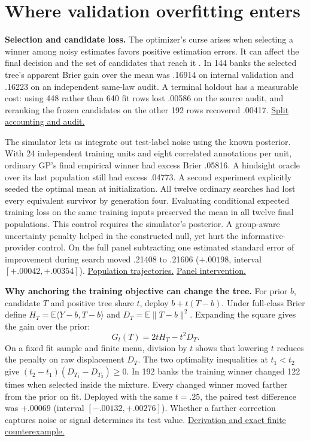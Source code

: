 \documentclass[10pt,a4paper]{article}
\newcommand{\FB}[2]{\href{https://github.com/damiankucharski/fusionbench/blob/5f9254e0c6e4559d7c0d19f28dc91641fba09d57/docs/ensemble-study/#1}{#2}}
\begin{document}


\section{Where validation overfitting enters}
\textbf{Selection and candidate loss.}
The optimizer's curse arises when selecting a winner among noisy estimates favors positive estimation errors. It can affect the final decision and the set of candidates that reach it \cite{cawley}. In 144 banks the selected tree's apparent Brier gain over the mean was .16914 on internal validation and .16223 on an independent same-law audit. A terminal holdout has a measurable cost: using 448 rather than 640 fit rows lost .00586 on the source audit, and reranking the frozen candidates on the other 192 rows recovered .00417. \FB{validation-curse/README.md}{Split accounting and audit.}

The simulator lets us integrate out test-label noise using the known posterior. With 24 independent training units and eight correlated annotations per unit, ordinary GP's final empirical winner had excess Brier .05816. A hindsight oracle over its last population still had excess .04773. A second experiment explicitly seeded the optimal mean at initialization. All twelve ordinary searches had lost every equivalent survivor by generation four. Evaluating conditional expected training loss on the same training inputs preserved the mean in all twelve final populations. This control requires the simulator's posterior. A group-aware uncertainty penalty helped in the constructed null, yet hurt the informative-provider control. On the full panel subtracting one estimated standard error of improvement during search moved .21408 to .21606 ($+.00198$, interval $[+.00042,+.00354]$). \FB{validation-curse/grouped/README.md}{Population trajectories.} \FB{validation-curse/panel/round2/README.md}{Panel intervention.}

\textbf{Why anchoring the training objective can change the tree.}
For prior $b$, candidate $T$ and positive tree share $t$, deploy $b+t(T-b)$. Under full-class Brier define $H_T=\mathbb E\langle Y-b,T-b\rangle$ and $D_T=\mathbb E\|T-b\|^2$. Expanding the square gives the gain over the prior:
\[
G_t(T)=2t H_T-t^2 D_T.
\]
On a fixed fit sample and finite menu, division by $t$ shows that lowering $t$ reduces the penalty on raw displacement $D_T$. The two optimality inequalities at $t_1<t_2$ give $(t_2-t_1)(D_{T_1}-D_{T_2})\ge0$. In 192 banks the training winner changed 122 times when selected inside the mixture. Every changed winner moved farther from the prior on fit. Deployed with the same $t=.25$, the paired test difference was $+.00069$ (interval $[-.00132,+.00276]$). Whether a farther correction captures noise or signal determines its test value. \FB{anchoring-geometry/README.md}{Derivation and exact finite counterexample.}
\end{document}
